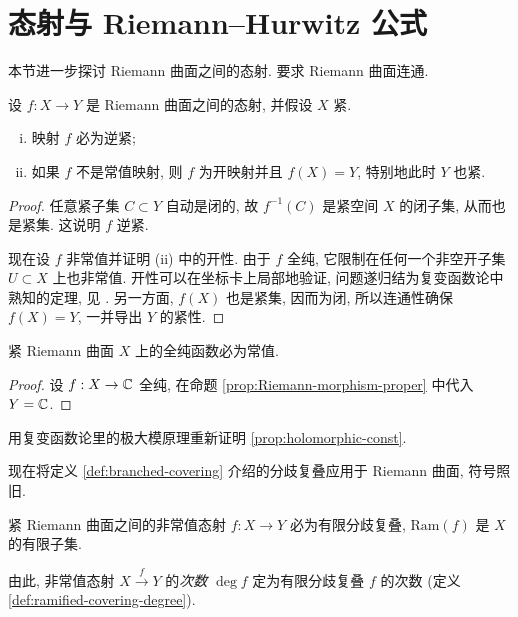 \section{态射与 Riemann--Hurwitz 公式}\label{sec:Riemann-Hurwitz}
本节进一步探讨 Riemann 曲面之间的态射. 要求 Riemann 曲面连通.
\begin{proposition}\label{prop:Riemann-morphism-proper}
	设 $f: X \to Y$ 是 Riemann 曲面之间的态射, 并假设 $X$ 紧.
	\begin{enumerate}[(i)]
		\item 映射 $f$ 必为逆紧;
		\item 如果 $f$ 不是常值映射, 则 $f$ 为开映射并且 $f(X) = Y$, 特别地此时 $Y$ 也紧.
	\end{enumerate}
\end{proposition}
\begin{proof}
	任意紧子集 $C \subset Y$ 自动是闭的, 故 $f^{-1}(C)$ 是紧空间 $X$ 的闭子集, 从而也是紧集. 这说明 $f$ 逆紧.
	
	现在设 $f$ 非常值并证明 (ii) 中的开性. 由于 $f$ 全纯, 它限制在任何一个非空开子集 $U \subset X$ 上也非常值. 开性可以在坐标卡上局部地验证, 问题遂归结为复变函数论中熟知的定理, 见 \cite[\S 3.4, 定理 3]{TW06} . 另一方面, $f(X)$ 也是紧集, 因而为闭, 所以连通性确保 $f(X)=Y$, 一并导出 $Y$ 的紧性.
\end{proof}

\begin{proposition}\label{prop:holomorphic-const}
	紧 Riemann 曲面 $X$ 上的全纯函数必为常值.
\end{proposition}
\begin{proof}
	设 $f: X \to \mathbb{C}$ 全纯, 在命题 \ref{prop:Riemann-morphism-proper} 中代入 $Y = \mathbb{C}$.
\end{proof}

\begin{exercise}
	用复变函数论里的极大模原理重新证明 \ref{prop:holomorphic-const}.
\end{exercise}

现在将定义 \ref{def:branched-covering} 介绍的分歧复叠应用于 Riemann 曲面, 符号照旧.

\begin{proposition}\label{prop:morphism-ramified-covering}
	紧 Riemann 曲面之间的非常值态射 $f: X \to Y$ 必为有限分歧复叠, $\mathrm{Ram}(f)$ 是 $X$ 的有限子集.
\end{proposition}

由此, 非常值态射 $X \xrightarrow{f} Y$ 的\emph{次数} $\deg f$ 定为有限分歧复叠 $f$ 的次数 (定义 \ref{def:ramified-covering-degree}).


